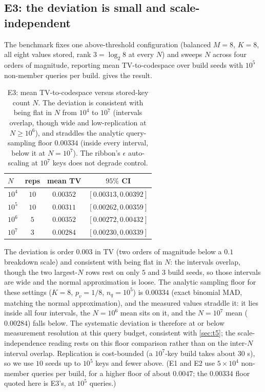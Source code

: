 \documentclass[acmsmall,review]{acmart}
\begin{document}
\subsection{E3: the deviation is small and scale-independent}

The benchmark fixes one above-threshold configuration (balanced $M = 8$, $K = 8$, all
eight values stored, rank $3 = \log_2 8$ at every $N$) and sweeps $N$ across four orders of
magnitude, reporting mean TV-to-codespace over build seeds with $10^5$ non-member queries
per build.  gives the result.

\begin{table}[t]
  \centering
  \caption{E3: mean TV-to-codespace versus stored-key count $N$. The deviation is consistent
  with being flat in $N$ from $10^4$ to $10^7$ (intervals overlap, though wide and
  low-replication at $N \ge 10^6$), and straddles the analytic query-sampling floor $0.00334$
  (inside every interval, below it at $N = 10^7$). The ribbon's $\epsilon$ auto-scaling at
  $10^7$ keys does not degrade control.}
  \label{tab:e3}
  \begin{tabular}{lccc}
    \toprule
    $N$ & reps & mean TV & $95\%$ CI \\
    \midrule
    $10^4$ & $10$ & $0.00352$ & $[0.00313, 0.00392]$ \\
    $10^5$ & $10$ & $0.00311$ & $[0.00262, 0.00359]$ \\
    $10^6$ & $5$  & $0.00352$ & $[0.00272, 0.00432]$ \\
    $10^7$ & $3$  & $0.00284$ & $[0.00230, 0.00339]$ \\
    \bottomrule
  \end{tabular}
\end{table}

The deviation is order $0.003$ in TV (two orders of magnitude below a $0.1$ breakdown
scale) and consistent with being flat in $N$: the intervals overlap, though the two
largest-$N$ rows rest on only $5$ and $3$ build seeds, so those intervals are wide and the
normal approximation is loose. The analytic sampling floor for these
settings ($K = 8$, $p_v = 1/8$, $n_q = 10^5$) is $0.00334$ (exact binomial MAD, matching
the normal approximation), and the measured values straddle it: it lies inside all four
intervals, the $N = 10^6$ mean sits on it, and the $N = 10^7$ mean ($0.00284$) falls
below. The systematic deviation is therefore at or below measurement resolution at this
query budget, consistent with \cref{sec:t5}; the scale-independence reading rests on this
floor comparison rather than on the inter-$N$ interval overlap. Replication is cost-bounded
(a $10^7$-key build takes about $30$ s), so we use $10$ seeds up to $10^5$ keys and fewer
above. (E1 and E2 use $5 \times 10^4$ non-member queries per build, for a higher floor of
about $0.0047$; the $0.00334$ floor quoted here is E3's, at $10^5$ queries.)
\end{document}
